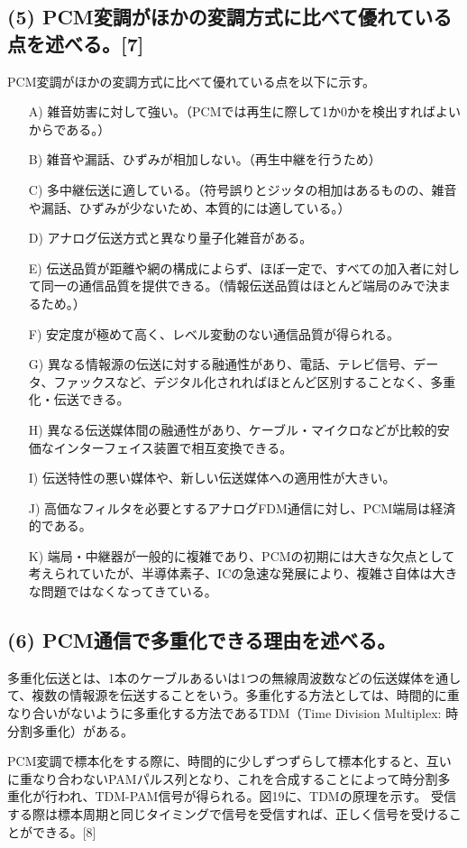 \documentclass[
  a4paper,
  11pt,
]{ltjsarticle}
\begin{document}
\subsection{(5) PCM変調がほかの変調方式に比べて優れている点を述べる。[7]}
PCM変調がほかの変調方式に比べて優れている点を以下に示す。
\begin{itemize}
    \item[A)] 雑音妨害に対して強い。（PCMでは再生に際して1か0かを検出すればよいからである。）
    \item[B)] 雑音や漏話、ひずみが相加しない。（再生中継を行うため）
    \item[C)] 多中継伝送に適している。（符号誤りとジッタの相加はあるものの、雑音や漏話、ひずみが少ないため、本質的には適している。）
    \item[D)] アナログ伝送方式と異なり量子化雑音がある。
    \item[E)] 伝送品質が距離や網の構成によらず、ほぼ一定で、すべての加入者に対して同一の通信品質を提供できる。（情報伝送品質はほとんど端局のみで決まるため。）
    \item[F)] 安定度が極めて高く、レベル変動のない通信品質が得られる。
    \item[G)] 異なる情報源の伝送に対する融通性があり、電話、テレビ信号、データ、ファックスなど、デジタル化されればほとんど区別することなく、多重化・伝送できる。
    \item[H)] 異なる伝送媒体間の融通性があり、ケーブル・マイクロなどが比較的安価なインターフェイス装置で相互変換できる。
    \item[I)] 伝送特性の悪い媒体や、新しい伝送媒体への適用性が大きい。
    \item[J)] 高価なフィルタを必要とするアナログFDM通信に対し、PCM端局は経済的である。
    \item[K)] 端局・中継器が一般的に複雑であり、PCMの初期には大きな欠点として考えられていたが、半導体素子、ICの急速な発展により、複雑さ自体は大きな問題ではなくなってきている。
\end{itemize}

\subsection{(6) PCM通信で多重化できる理由を述べる。}
多重化伝送とは、1本のケーブルあるいは1つの無線周波数などの伝送媒体を通して、複数の情報源を伝送することをいう。多重化する方法としては、時間的に重なり合いがないように多重化する方法であるTDM（Time Division Multiplex: 時分割多重化）がある。

PCM変調で標本化をする際に、時間的に少しずつずらして標本化すると、互いに重なり合わないPAMパルス列となり、これを合成することによって時分割多重化が行われ、TDM-PAM信号が得られる。図19に、TDMの原理を示す。
受信する際は標本周期と同じタイミングで信号を受信すれば、正しく信号を受けることができる。[8]
\end{document}
